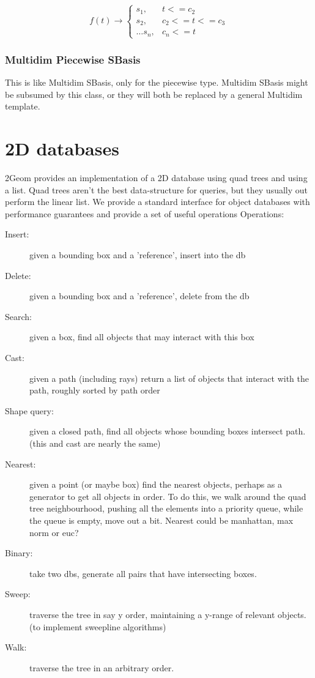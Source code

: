 \documentclass[openany]{book}
\begin{document}
$$
f(t) \rightarrow \left\{ 
\begin{array}{cc}
s_1,& t <= c_2 \\
s_2,& c_2 <= t <= c_3\\
\ldots
s_n,& c_n <= t
\end{array}\right.
$$

\subsection{Multidim Piecewise SBasis}
This is like Multidim SBasis, only for the piecewise type.  Multidim
SBasis might be subsumed by this class, or they will both be replaced
by a general Multidim template.

\chapter{2D databases}

2Geom provides an implementation of a 2D database using quad trees and
using a list.  Quad trees aren't the best data-structure for queries,
but they usually out perform the linear list.  We provide a
standard interface for object databases with performance guarantees
and provide a set of useful operations Operations:

\begin{description}
\item[Insert:] given a bounding box and a 'reference', insert into the db
\item[Delete:] given a bounding box and a 'reference', delete from the db
\item[Search:] given a box, find all objects that may interact with this box
\item[Cast:] given a path (including rays) return a list of objects that interact with the path, roughly sorted by path order
\item[Shape query:] given a closed path, find all objects whose bounding boxes intersect path.  (this and cast are nearly the same)
\item[Nearest:] given a point (or maybe box) find the nearest objects, perhaps as a generator to get all objects in order.  To do this, we walk around the quad tree neighbourhood, pushing all the elements into a priority queue, while the queue is empty, move out a bit.  Nearest could be manhattan, max norm or euc?
\item[Binary:] take two dbs, generate all pairs that have intersecting boxes.
\item[Sweep:] traverse the tree in say y order, maintaining a y-range of relevant objects. (to implement sweepline algorithms)
\item[Walk:] traverse the tree in an arbitrary order.
\end{description}
\end{document}
